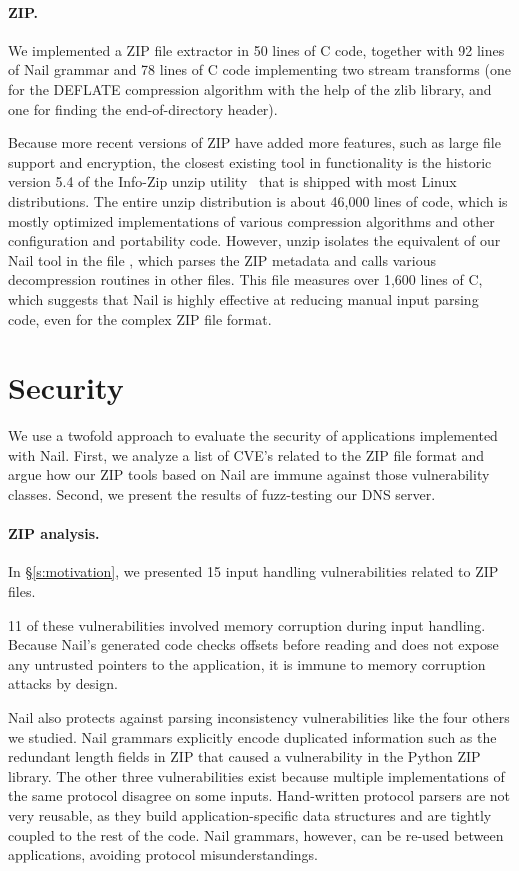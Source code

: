 \paragraph{ZIP.}

We implemented a ZIP file extractor in 50 lines of C code, together with
92 lines of Nail grammar and 78 lines of C code implementing two stream
transforms (one for the DEFLATE compression algorithm with the help of
the zlib library, and one for finding the end-of-directory header).

Because more recent versions of ZIP have added more features, such
as large file support and encryption, the closest existing tool
in functionality is the historic version 5.4 of the Info-Zip unzip
utility~\cite{infozip} that is shipped with most Linux distributions.
The entire unzip distribution is about 46,000 lines of code, which is
mostly optimized implementations of various compression algorithms and
other configuration and portability code.  However, unzip isolates the
equivalent of our Nail tool in the file , which parses the
ZIP metadata and calls various decompression routines in other files. This
file measures over 1,600 lines of C, which suggests that Nail is highly
effective at reducing manual input parsing code, even for the complex
ZIP file format.

\section{Security} 

We use a twofold approach to evaluate the security of applications
implemented with Nail. First, we analyze a list of CVE's related to the
ZIP file format and argue how our ZIP tools based on Nail are immune
against those vulnerability classes. Second, we present the results of
fuzz-testing our DNS server.

\paragraph{ZIP analysis.}

In \S\ref{s:motivation}, we presented 15 input handling vulnerabilities
related to ZIP files.

11 of these vulnerabilities involved memory corruption during input handling.
Because Nail's generated code checks offsets before reading and does not
expose any untrusted pointers to the application, it is immune to
memory corruption attacks by design.

Nail also protects against parsing inconsistency vulnerabilities like the four others we studied.
Nail grammars explicitly encode duplicated information such as the redundant length fields in ZIP
that caused a vulnerability in the Python ZIP library. The other three vulnerabilities exist
because multiple implementations of the same protocol disagree on some inputs. Hand-written protocol
parsers are not very reusable, as they build application-specific data structures and are tightly
coupled to the rest of the code. Nail grammars, however, can be re-used between applications,
avoiding protocol misunderstandings.

